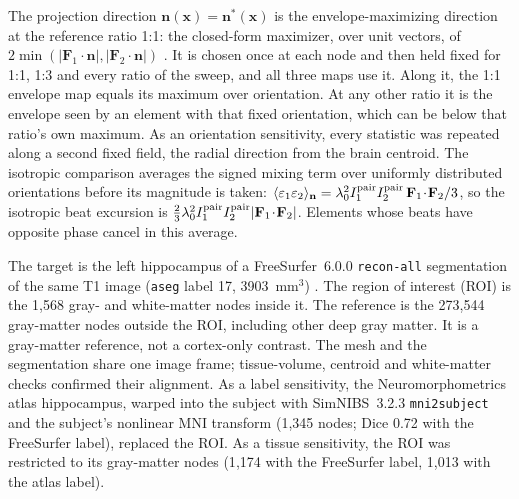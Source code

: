 \documentclass[11pt,a4paper]{article}
\begin{document}
The projection direction $\mathbf n(\mathbf x)=\mathbf n^*(\mathbf x)$ is the envelope-maximizing direction at
the reference ratio 1:1: the closed-form maximizer, over unit vectors, of
$2\min(|\mathbf F_1\!\cdot\!\mathbf n|,|\mathbf F_2\!\cdot\!\mathbf n|)$
\cite{grossman2017}. It is chosen once at each node and then held fixed for 1:1, 1:3
and every ratio of the sweep, and all three maps use it. Along it, the 1:1 envelope map
equals its maximum over orientation. At any other ratio it is the envelope seen by an
element with that fixed orientation, which can be below that ratio's own maximum. As an
orientation sensitivity, every statistic was repeated along a second fixed field, the
radial direction from the brain centroid. The isotropic comparison averages the signed
mixing term over uniformly distributed orientations before its magnitude is taken:
$\langle\varepsilon_1\varepsilon_2\rangle_{\mathbf n}
=\lambda_0^2I_1^{\rm pair}I_2^{\rm pair}\,\mathbf F_1\!\cdot\!\mathbf F_2/3$, so the
isotropic beat excursion is
$\tfrac23\lambda_0^2I_1^{\rm pair}I_2^{\rm pair}|\mathbf F_1\!\cdot\!\mathbf F_2|$.
Elements whose beats have opposite phase cancel in this average.

The target is the left hippocampus of a FreeSurfer~6.0.0 \texttt{recon-all}
segmentation of the same T1 image (\texttt{aseg} label 17, 3903~mm$^3$)
\cite{fischl2002}. The region of interest (ROI) is the 1{,}568 gray- and white-matter
nodes inside it. The reference is the 273{,}544 gray-matter nodes outside the
ROI, including other deep gray matter. It is a gray-matter reference, not a cortex-only contrast.
The mesh and the segmentation share one image frame; tissue-volume, centroid and
white-matter checks confirmed their alignment. As a label sensitivity, the
Neuromorphometrics atlas hippocampus, warped into the subject with SimNIBS~3.2.3
\texttt{mni2subject} and the subject's nonlinear MNI transform (1{,}345 nodes; Dice 0.72
with the FreeSurfer label), replaced the ROI. As a tissue sensitivity, the ROI was
restricted to its gray-matter nodes (1{,}174 with the FreeSurfer label, 1{,}013 with
the atlas label).
\end{document}
